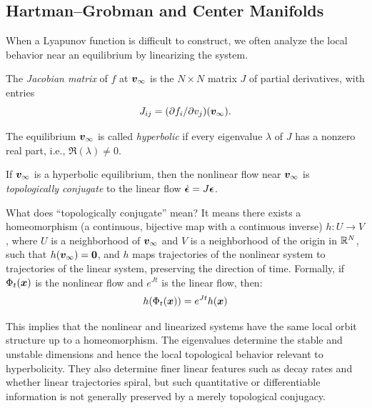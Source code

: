 \subsection{Hartman--Grobman and Center Manifolds}

When a Lyapunov function is difficult to construct, we often analyze the local behavior near an equilibrium by linearizing the system.

\begin{definition}
The \textit{Jacobian matrix} of $f$ at $\bm{v}_\infty$ is the $N \times N$ matrix $J$ of partial derivatives, with entries
\[
J_{ij} = (\partial f_i/\partial v_j)(\bm{v}_\infty).
\]

The equilibrium $\bm{v}_\infty$ is called \textit{hyperbolic} if every eigenvalue $\lambda$ of $J$ has a nonzero real part, i.e., $\Re(\lambda) \neq 0$.
\end{definition}

\begin{theorem}
If $\bm{v}_\infty$ is a hyperbolic equilibrium, then the nonlinear flow near $\bm{v}_\infty$ is \textit{topologically conjugate} to the linear flow $\dot{\boldsymbol{\epsilon}} = J\boldsymbol{\epsilon}$.
\end{theorem}

\begin{remark}
What does ``topologically conjugate'' mean? It means there exists a homeomorphism (a continuous, bijective map with a continuous inverse) $h: U \to V$, where $U$ is a neighborhood of $\bm{v}_\infty$ and $V$ is a neighborhood of the origin in $\mathbb{R}^N$, such that $h(\bm{v}_\infty) = \mathbf{0}$, and $h$ maps trajectories of the nonlinear system to trajectories of the linear system, preserving the direction of time. Formally, if $\Phi_t(\bm{x})$ is the nonlinear flow and $e^{Jt}$ is the linear flow, then:
\begin{equation}
h(\Phi_t(\bm{x})) = e^{Jt} h(\bm{x})
\end{equation}

This implies that the nonlinear and linearized systems have the same local
orbit structure up to a homeomorphism. The eigenvalues determine the
stable and unstable dimensions and hence the local topological behavior
relevant to hyperbolicity. They also determine finer linear features such
as decay rates and whether linear trajectories spiral, but such
quantitative or differentiable information is not generally preserved by
a merely topological conjugacy.
\end{remark}

